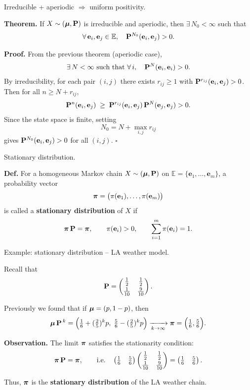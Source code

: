 \documentclass[aspectratio=169]{beamer}
\newcommand{\e}[0]{\textbf{e}}
\newcommand{\E}[0]{\mathbb{E}}
\begin{document}
 \begin{frame}{Irreducible + aperiodic $\Rightarrow$ uniform positivity.}

\textbf{Theorem.}
If $X\sim(\mbox{\boldmath $\mu$},\mathbf{P})$ is irreducible and aperiodic,
then $\exists\,N_0<\infty$ such that
\[
\forall\,\e_i,\e_j\in\E,\quad \bfP^{N_0}(\e_i,\e_j)>0.
\]

\textbf{Proof.}
From the previous theorem (aperiodic case),
\[
\exists\,N<\infty\ \text{such that}\
\forall\,i,\quad \bfP^{N}(\e_i,\e_i)>0.
\]
\pause
By irreducibility, for each pair $(i,j)$
there exists $r_{ij}\ge1$ with
\(\bfP^{r_{ij}}(\e_i,\e_j)>0\).
Then for all \(n\ge N+r_{ij}\),
\[
\bfP^{n}(\e_i,\e_j)
\;\ge\;
\bfP^{r_{ij}}(\e_i,\e_j)\,\bfP^{N}(\e_j,\e_j)
>0.
\]
\pause
Since the state space is finite, setting
\[
N_0 = N + \max_{i,j} r_{ij}
\]
gives $\bfP^{N_0}(\e_i,\e_j)>0$ for all $(i,j)$.
\hfill$\square$

\end{frame}


\begin{frame}{Stationary distribution.}

\textbf{Def.}
For a homogeneous Markov chain \(X\sim(\mbox{\boldmath $\mu$},\mathbf{P})\) on \(\E=\{\e_1,\ldots,\e_m\}\),
a probability vector
\[
\bfpi = \big(\pi(\e_1),\ldots,\pi(\e_m)\big)
\]
is called a \textbf{stationary distribution} of \(X\) if
\[
\bfpi\,\bfP = \bfpi,
\qquad
\pi(\e_i)>0,
\qquad
\sum_{i=1}^{m}\pi(\e_i)=1.
\]

\end{frame}

\begin{frame}{Example: stationary distribution – LA weather model.}

Recall that
\[
\mathbf{P}=
\begin{pmatrix}
\frac12 & \frac12\\[2pt]
\frac1{10} & \frac9{10}
\end{pmatrix}.
\]

Previously we found that if \(\mbox{\boldmath $\mu$}=(p,1-p)\), then
\[
\mbox{\boldmath $\mu$}\,\mathbf{P}^{\,k}=
\Bigl(
\tfrac16+(\tfrac25)^k p,\;
\tfrac56-(\tfrac25)^k p
\Bigr)
\xrightarrow[k\to\infty]{}
\mbox{\boldmath$\pi$}=\Bigl(\tfrac16,\tfrac56\Bigr).
\]

\medskip
\textbf{Observation.}
The limit \(\mbox{\boldmath$\pi$}\) satisfies the stationarity condition:
\[
\mbox{\boldmath$\pi$}\,\mathbf{P} = \mbox{\boldmath$\pi$},
\qquad
\text{i.e.}\quad
\begin{pmatrix}
\tfrac16 & \tfrac56
\end{pmatrix}
\begin{pmatrix}
\frac12 & \frac12\\[2pt]
\frac1{10} & \frac9{10}
\end{pmatrix}
=
\begin{pmatrix}
\tfrac16 & \tfrac56
\end{pmatrix}.
\]

Thus, \(\mbox{\boldmath$\pi$}\) is the \textbf{stationary distribution} of the LA weather chain.

\end{frame}
\end{document}
